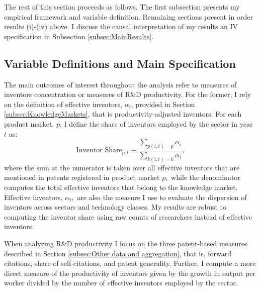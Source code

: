 The rest of this section proceeds as follows. The first subsection
presents my empirical framework and variable definition. Remaining
sections present in order results (i)-(iv) above. I discuss the causal
interpretation of my results an IV specification in Subsection \ref{subsec:MainResults}.

\subsection{Variable Definitions and Main Specification}

The main outcomes of interest throughout the analysis refer to measures
of inventors concentration or measures of R\&D productivity. For the
former, I rely on the definition of effective inventors, $\alpha_{i}$,
provided in Section \ref{subsec:KnowledgeMarkets}, that is productivity-adjusted
inventors. For each product market, $p$, I define the share of inventors
employed by the sector in year $t$ as:
\[
\text{Inventor\ Share}{}_{p,t}\equiv\frac{\sum_{p(i,t)=p}\alpha_{i}}{\sum_{k(i,t)=k}\alpha_{i}},
\]
where the sum at the numerator is taken over all effective inventors
that are mentioned in patents registered in product market $p,$ while
the denominator computes the total effective inventors that belong
to the knowledge market. Effective inventors, $\alpha_{i},$ are also
the measure I use to evaluate the dispersion of inventors across sectors
and technology classes. My results are robust to computing the inventor
share using raw counts of researchers instead of effective inventors.

When analyzing R\&D productivity I focus on the three patent-based
measures described in Section \ref{subsec:Other data and aggregation},
that is, forward citations, share of self-citations, and patent generality.
Further, I compute a more direct measure of the productivity of inventors
given by the growth in output per worker divided by the number of
effective inventors employed by the sector.

